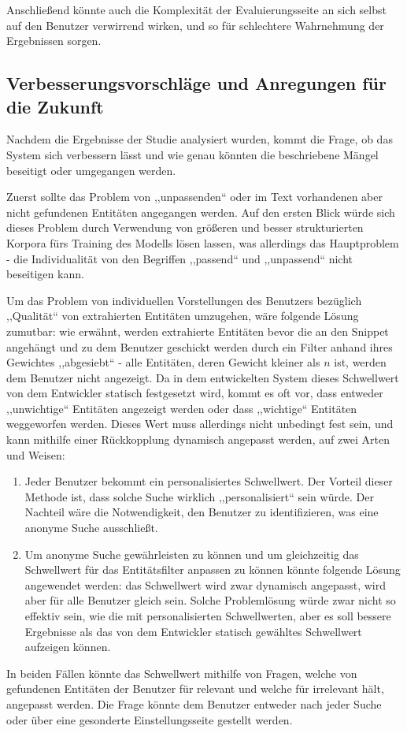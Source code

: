 Anschließend könnte auch die Komplexität der Evaluierungsseite an sich selbst auf den Benutzer verwirrend wirken, und so für schlechtere Wahrnehmung der Ergebnissen sorgen.

\subsection{Verbesserungsvorschläge und Anregungen für die Zukunft}
Nachdem die Ergebnisse der Studie analysiert wurden, kommt die Frage, ob das System sich verbessern lässt und wie genau könnten die beschriebene Mängel beseitigt oder umgegangen werden.

Zuerst sollte das Problem von ,,unpassenden`` oder im Text vorhandenen aber nicht gefundenen Entitäten angegangen werden. Auf den ersten Blick würde sich dieses Problem durch Verwendung von größeren und besser strukturierten Korpora fürs Training des Modells lösen lassen, was allerdings das Hauptproblem - die Individualität von den Begriffen ,,passend`` und ,,unpassend`` nicht beseitigen kann.

Um das Problem von individuellen Vorstellungen des Benutzers bezüglich ,,Qualität`` von extrahierten Entitäten umzugehen, wäre folgende Lösung zumutbar: wie erwähnt, werden extrahierte Entitäten bevor die an den Snippet angehängt und zu dem Benutzer geschickt werden durch ein Filter anhand ihres Gewichtes ,,abgesiebt`` - alle Entitäten, deren Gewicht kleiner als $n$ ist, werden dem Benutzer nicht angezeigt. Da in dem entwickelten System dieses Schwellwert von dem Entwickler statisch festgesetzt wird, kommt es oft vor, dass entweder ,,unwichtige`` Entitäten angezeigt werden oder dass ,,wichtige`` Entitäten weggeworfen werden. Dieses Wert muss allerdings nicht unbedingt fest sein, und kann mithilfe einer Rückkopplung dynamisch angepasst werden, auf zwei Arten und Weisen:
\begin{enumerate}
\item Jeder Benutzer bekommt ein personalisiertes Schwellwert. Der Vorteil dieser Methode ist, dass solche Suche wirklich ,,personalisiert`` sein würde. Der Nachteil wäre die Notwendigkeit, den Benutzer zu identifizieren, was eine anonyme Suche ausschließt. 
\item Um anonyme Suche gewährleisten zu können und um gleichzeitig das Schwellwert für das Entitätsfilter anpassen zu können könnte folgende Lösung angewendet werden: das Schwellwert wird zwar dynamisch angepasst, wird aber für alle Benutzer gleich sein. Solche Problemlösung würde zwar nicht so effektiv sein, wie die mit personalisierten Schwellwerten, aber es soll bessere Ergebnisse als das von dem Entwickler statisch gewähltes Schwellwert aufzeigen können.
\end{enumerate}
In beiden Fällen könnte das Schwellwert mithilfe von Fragen, welche von gefundenen Entitäten der Benutzer für relevant und welche für irrelevant hält, angepasst werden. Die Frage könnte dem Benutzer entweder nach jeder Suche oder über eine gesonderte Einstellungsseite gestellt werden.

